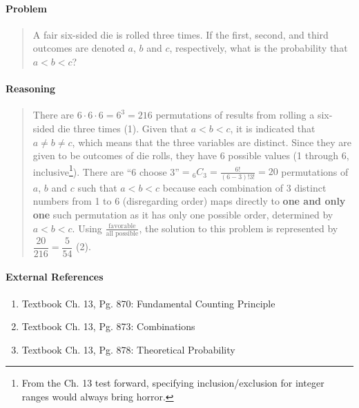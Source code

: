 \documentclass[letterpaper,12pt,twoside]{report}
\begin{document}
	\pagestyle{fancy}
	\fancyhf{}
	
	\paragraph{Problem}
	\begin{quote}
	\textsf{A fair six-sided die is rolled three times. If the first, second, and third outcomes are denoted $a$, $b$ and $c$, respectively, what is the probability that $a<b<c$?}
	\end{quote}
	
	\begin{center}
		\begin{tikzpicture}
		\end{tikzpicture}
	\end{center}
	
	\paragraph{Reasoning}
	\begin{quotation}
	
	There are $6\cdot6\cdot6=6^3=216$ permutations of results from rolling a six-sided die three times (1). Given that $a<b<c$, it is indicated that $a\neq b\neq c$, which means that the three variables are distinct. Since they are given to be outcomes of die rolls, they have 6 possible values (1 through 6, inclusive\footnote{From the Ch. 13 test forward, specifying inclusion/exclusion for integer ranges would always bring horror.}). There are ``6 choose 3''$={}_{6}C_3=\frac{6!}{(6-3)!3!}=20$ permutations of $a$, $b$ and $c$ such that $a<b<c$ because each combination of 3 distinct numbers from 1 to 6 (disregarding order) maps directly to \textbf{one and only one} such permutation as it has only one possible order, determined by $a<b<c$. Using $\frac{\text{favorable}}{\text{all possible}}$, the solution to this problem is represented by $\dfrac{20}{216} =\boxed{\dfrac{5}{54}}$ (2).
	
	\end{quotation}
	
	\paragraph{External References}
	
	\begin{enumerate}
		\item Textbook Ch. 13, Pg. 870: Fundamental Counting Principle
		\item Textbook Ch. 13, Pg. 873: Combinations
		\item Textbook Ch. 13, Pg. 878: Theoretical Probability
	\end{enumerate}
\end{document}
